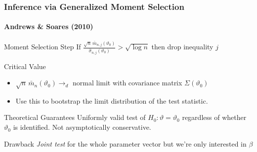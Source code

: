 \documentclass{beamer}
\begin{document}
\begin{frame}
  \frametitle{Inference via Generalized Moment Selection}
  \framesubtitle{Andrews \& Soares (2010)}

  \small

  \begin{block}{Moment Selection Step}
    If $\displaystyle\frac{\sqrt{n}\,\bar{m}_{n,j}(\vartheta_0)}{\widehat{\sigma}_{n,j}(\vartheta_0)} > \sqrt{\log n}$ then drop inequality $j$
  \end{block}

  \begin{block}{Critical Value} 
    \begin{itemize}
      \item $\sqrt{n}\, \bar{m}_n(\vartheta_0) \rightarrow_d$ normal limit with covariance matrix $\Sigma(\vartheta_0)$
      \item Use this to bootstrap the limit distribution of the test statistic.
    \end{itemize}
  \end{block}

  \begin{block}{Theoretical Guarantees}
    Uniformly valid test of $H_0\colon \vartheta = \vartheta_0$ \alert{regardless of whether $\vartheta_0$ is identified}.
    Not asymptotically conservative.
  \end{block}

  \begin{block}{Drawback}
   \emph{Joint test} for the whole parameter vector but we're only interested in $\beta$
  \end{block}

\end{frame}
\end{document}
